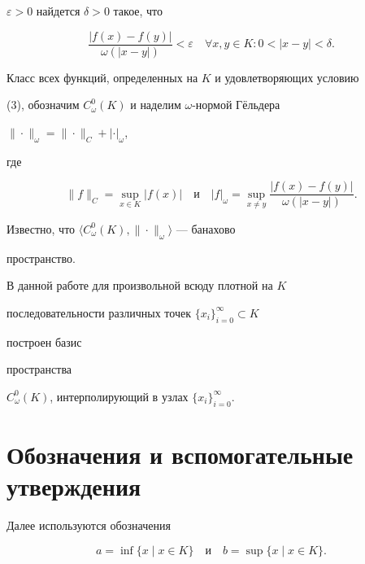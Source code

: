$\varepsilon>0$ найдется $\delta>0$ такое, что


\begin{equation}


\frac{|f(x)-f(y)|}{\omega(|x-y|)}<\varepsilon\quad


\forall x,y\in K:0<|x-y|<\delta.


\end{equation}


Класс всех функций, определенных на $K$ и удовлетворяющих условию


(3), обозначим $C^0_\omega(K)$ и наделим $\omega$-нормой Г\"ельдера


$\|\cdot\|_\omega=\|\cdot\|_C+|\cdot|_\omega$,


где


$$


\|f\|_C=\sup_{x\in K}|f(x)|\quad


\text{и}\quad


|f|_\omega=\sup_{x\ne y}


\frac{|f(x)-f(y)|}{\omega(|x-y|)}.


$$


Известно, что $\langle C^0_\omega(K),\|\cdot\|_\omega\rangle$ --- банахово


пространство.





В данной работе для произвольной всюду плотной на $K$


последовательности различных точек $\{x_i\}^\infty_{i=0}\subset K$


построен базис


пространства


$C^0_\omega(K)$, интерполирующий в узлах $\{x_i\}^\infty_{i=0}$.





\section{Обозначения и вспомогательные утверждения}





Далее используются обозначения


\begin{equation}


a=\inf\{x\mid x\in K\}\quad\text{и}\quad


b=\sup\{x\mid x\in K\}.


\end{equation}


